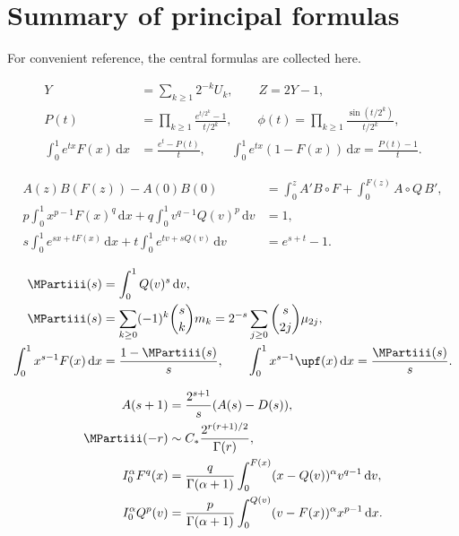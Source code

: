 \documentclass[11pt,oneside]{article}
\theoremstyle{definition}
\theoremstyle{remark}
\newcommand{\F}{F}
\newcommand{\Q}{Q}
\newcommand{\dd}{\,\mathrm d}
\newcommand{\1}{\mathbf 1}
\begin{document}
\section{Summary of principal formulas}

For convenient reference, the central formulas are collected here.

\begin{resultbox}
\begin{align*}
 Y&=\sum_{k\ge1}2^{-k}U_k,\qquad Z=2Y-1,\\
 P(t)&=\prod_{k\ge1}\frac{e^{t/2^k}-1}{t/2^k},\qquad
 \phi(t)=\prod_{k\ge1}\frac{\sin(t/2^k)}{t/2^k},\\
 \int_0^1e^{tx}\F(x)\dd x&=\frac{e^t-P(t)}t,\qquad
 \int_0^1e^{tx}(1-\F(x))\dd x=\frac{P(t)-1}t.
\end{align*}
\end{resultbox}

\begin{resultbox}
\begin{align*}
 A(z)B(\F(z))-A(0)B(0)
 &=\int_0^zA'B\circ\F
 +\int_0^{\F(z)}A\circ\Q\,B',\\
 p\int_0^1x^{p-1}\F(x)^q\dd x
 +q\int_0^1v^{q-1}\Q(v)^p\dd v&=1,\\
 s\int_0^1e^{sx+t\F(x)}\dd x
 +t\int_0^1e^{tv+s\Q(v)}\dd v&=e^{s+t}-1.
\end{align*}
\end{resultbox}

\begin{resultbox}
\begin{align*}
 \MPartiii(s)&=\int_0^1\Q(v)^s\dd v,\\
 \MPartiii(s)&=\sum_{k\ge0}(-1)^k\binom skm_k
 =2^{-s}\sum_{j\ge0}\binom{s}{2j}\mu_{2j},\\
 \int_0^1x^{s-1}\F(x)\dd x&=\frac{1-\MPartiii(s)}s,\qquad
 \int_0^1x^{s-1}\upf(x)\dd x=\frac{\MPartiii(s)}s.
\end{align*}
\end{resultbox}

\begin{resultbox}
\begin{align*}
 A(s+1)&=\frac{2^{s+1}}s(A(s)-D(s)),\\
 \MPartiii(-r)&\sim C_*\frac{2^{r(r+1)/2}}{\Gamma(r)},\\
 I_0^\alpha\F^q(x)
 &=\frac{q}{\Gamma(\alpha+1)}
 \int_0^{\F(x)}(x-\Q(v))^\alpha v^{q-1}\dd v,\\
 I_0^\alpha\Q^p(v)
 &=\frac{p}{\Gamma(\alpha+1)}
 \int_0^{\Q(v)}(v-\F(x))^\alpha x^{p-1}\dd x.
\end{align*}
\end{resultbox}
\end{document}
